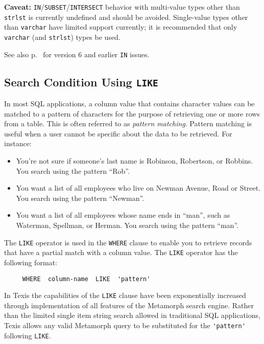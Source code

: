   {\bf Caveat:} {\tt IN}/{\tt SUBSET}/{\tt INTERSECT} behavior with
multi-value types other than \verb`strlst` is currently undefined and
should be avoided.  Single-value types other than \verb`varchar` have
limited support currently; it is recommended that only \verb`varchar`
(and \verb`strlst`) types be used.

  See also p.~\pageref{InWithVersion6} for version 6 and earlier
{\tt IN} issues.

\subsection{Search Condition Using {\tt LIKE}}

In most SQL applications, a column value that contains character
values can be matched to a pattern of characters for the purpose of
retrieving one or more rows from a table.  This is often referred to
as {\em pattern matching}.  Pattern matching is useful when a user
cannot be specific about the data to be retrieved.  For instance:

\begin{itemize}
\item You're not sure if someone's last name is Robinson, Robertson,
or Robbins.  You search using the pattern ``Rob''.

\item You want a list of all employees who live on Newman Avenue, Road
or Street.  You search using the pattern ``Newman''.

\item You want a list of all employees whose name ends in ``man'',
such as Waterman, Spellman, or Herman.  You search using the pattern
``man''.
\end{itemize}

The \verb`LIKE` operator is used in the \verb`WHERE` clause to enable you to
retrieve records that have a partial match with a column value.  The
\verb`LIKE` operator has the following format:
\begin{verbatim}
     WHERE  column-name  LIKE  'pattern'
\end{verbatim}

In Texis the capabilities of the \verb`LIKE` clause have been exponentially
increased through implementation of all features of the Metamorph
search engine.  Rather than the limited single item string search
allowed in traditional SQL applications, Texis allows any valid
Metamorph query to be substituted for the \verb`'pattern'` following
\verb`LIKE`.

